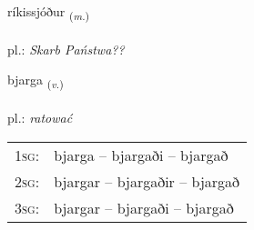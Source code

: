 \documentclass[frontgrid, backgrid]{flacards}\usepackage[]{graphicx}\usepackage[]{xcolor}
\begin{document}
\renewcommand{\flhead}{\vskip5pt \fboxsep=0pt {\small\bfseries\footnotesize Nafnorð | Noun}}
\renewcommand{\fcfoot}{\vskip5pt \fboxsep=0pt \hspace{2pt}{\small\bfseries\footnotesize 2K}}

\renewcommand{\blhead}{\vskip5pt {\small\bfseries\footnotesize Nafnorð | Noun }}
\renewcommand{\bcfoot}{\vskip5pt \hspace{2pt}{\small\bfseries\footnotesize 2K}}


{ríkissjóður \small{\textsubscript{(\textit{m.})}} \\[1ex] %
\textphonetic{[riːcɪsjouðʏr]} \\
pl.: \emph{Skarb Państwa??} \\  [2ex]
\renewcommand*{\arraystretch}{0.8}
}

\renewcommand{\flhead}{\vskip5pt \fboxsep=0pt {\small\bfseries\footnotesize Sagnorð | Verb}}
\renewcommand{\fcfoot}{\vskip5pt \fboxsep=0pt \hspace{2pt}{\small\bfseries\footnotesize 2K}}

\renewcommand{\blhead}{\vskip5pt {\small\bfseries\footnotesize Sagnorð | Verb }}
\renewcommand{\bcfoot}{\vskip5pt \hspace{2pt}{\small\bfseries\footnotesize 2K}}


{bjarga \small{\textsubscript{(\textit{v.})}} \\[1ex] %
\textphonetic{[pjarka]} \\
pl.: \emph{ratować} \\  [2ex]
\renewcommand*{\arraystretch}{0.8}
\begin{tabular}{p{1cm}l}
\textsc{1sg}: & bjarga -- bjargaði -- bjargað \\ 
\textsc{2sg}: & bjargar -- bjargaðir -- bjargað \\ 
\textsc{3sg}: & bjargar -- bjargaði -- bjargað \\ 
\end{tabular}
}
\end{document}
